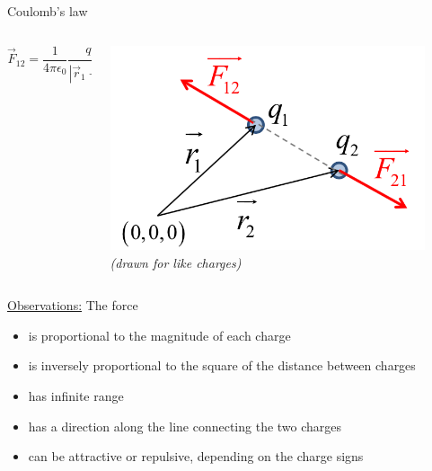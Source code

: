 %
%
%

\begin{frame}{Coulomb's law}

\begin{columns}
  \begin{column}{0.60\textwidth}
     {\Large
     \begin{equation*}
       \vec{F}_{12} = \frac{1}{4\pi\epsilon_0} \frac{q_1 q_2}{|\vec{r}_{1}-\vec{r}_{2}|^{2}} \hat{r}_{12}
     \end{equation*}
     }
  \end{column}
  \begin{column}{0.40\textwidth}
   \begin{center}
     \includegraphics[width=0.90\textwidth]{./images/schematics/coulomb_force_2_like_charges.png}\\
     \vspace{0.3cm}
     {\it \small (drawn for like charges)}
   \end{center}
  \end{column}
\end{columns}

\underline{Observations:} The force
\begin{itemize}
  \item is proportional to the magnitude of each charge
  \item is inversely proportional to the square of the distance between charges
  \item has infinite range
  \item has a direction along the line connecting the two charges
  \item can be attractive or repulsive, depending on the charge signs
\end{itemize}

\end{frame}

